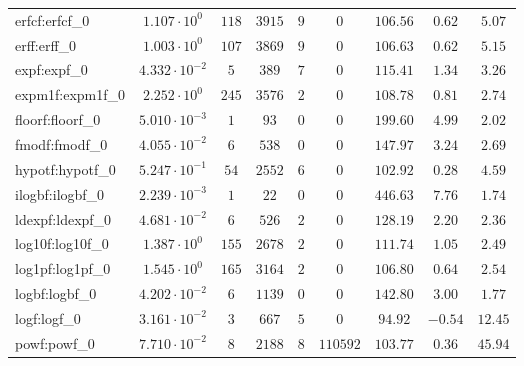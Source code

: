 \begin{tabular}{|l|c|c|c|c|c|c|c|c|}
erfcf:erfcf\_0               & $ 1.107 \cdot 10^{0}  $ & $ 118    $ & $ 3915   $ & $ 9   $ & $ 0      $ & $ 106.56      $ & $ 0.62    $ & $ 5.07    $ \\
erff:erff\_0                 & $ 1.003 \cdot 10^{0}  $ & $ 107    $ & $ 3869   $ & $ 9   $ & $ 0      $ & $ 106.63      $ & $ 0.62    $ & $ 5.15    $ \\
expf:expf\_0                 & $ 4.332 \cdot 10^{-2} $ & $ 5      $ & $ 389    $ & $ 7   $ & $ 0      $ & $ 115.41      $ & $ 1.34    $ & $ 3.26    $ \\
expm1f:expm1f\_0             & $ 2.252 \cdot 10^{0}  $ & $ 245    $ & $ 3576   $ & $ 2   $ & $ 0      $ & $ 108.78      $ & $ 0.81    $ & $ 2.74    $ \\
floorf:floorf\_0             & $ 5.010 \cdot 10^{-3} $ & $ 1      $ & $ 93     $ & $ 0   $ & $ 0      $ & $ 199.60      $ & $ 4.99    $ & $ 2.02    $ \\
fmodf:fmodf\_0               & $ 4.055 \cdot 10^{-2} $ & $ 6      $ & $ 538    $ & $ 0   $ & $ 0      $ & $ 147.97      $ & $ 3.24    $ & $ 2.69    $ \\
hypotf:hypotf\_0             & $ 5.247 \cdot 10^{-1} $ & $ 54     $ & $ 2552   $ & $ 6   $ & $ 0      $ & $ 102.92      $ & $ 0.28    $ & $ 4.59    $ \\
ilogbf:ilogbf\_0             & $ 2.239 \cdot 10^{-3} $ & $ 1      $ & $ 22     $ & $ 0   $ & $ 0      $ & $ 446.63      $ & $ 7.76    $ & $ 1.74    $ \\
ldexpf:ldexpf\_0             & $ 4.681 \cdot 10^{-2} $ & $ 6      $ & $ 526    $ & $ 2   $ & $ 0      $ & $ 128.19      $ & $ 2.20    $ & $ 2.36    $ \\
log10f:log10f\_0             & $ 1.387 \cdot 10^{0}  $ & $ 155    $ & $ 2678   $ & $ 2   $ & $ 0      $ & $ 111.74      $ & $ 1.05    $ & $ 2.49    $ \\
log1pf:log1pf\_0             & $ 1.545 \cdot 10^{0}  $ & $ 165    $ & $ 3164   $ & $ 2   $ & $ 0      $ & $ 106.80      $ & $ 0.64    $ & $ 2.54    $ \\
logbf:logbf\_0               & $ 4.202 \cdot 10^{-2} $ & $ 6      $ & $ 1139   $ & $ 0   $ & $ 0      $ & $ 142.80      $ & $ 3.00    $ & $ 1.77    $ \\
logf:logf\_0                 & $ 3.161 \cdot 10^{-2} $ & $ 3      $ & $ 667    $ & $ 5   $ & $ 0      $ & $ 94.92       $ & $ -0.54   $ & $ 12.45   $ \\
powf:powf\_0                 & $ 7.710 \cdot 10^{-2} $ & $ 8      $ & $ 2188   $ & $ 8   $ & $ 110592 $ & $ 103.77      $ & $ 0.36    $ & $ 45.94   $ \\

\end{tabular}
